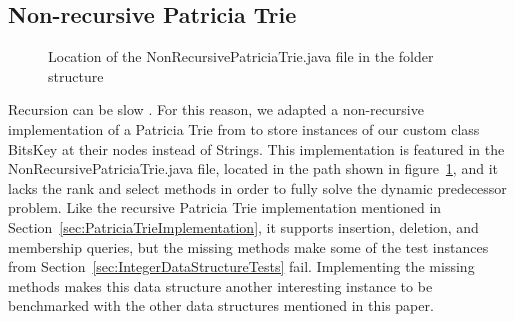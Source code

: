 \subsection{Non-recursive Patricia Trie}

\begin{figure}[H]
\caption{Location of the {\ttfamily NonRecursivePatriciaTrie.java} file in the folder structure}
\label{fig:NonRecursivePatriciaTrieTree}
\end{figure}

Recursion can be slow \cite{shirazi2003java}. For this reason, we adapted a non-recursive implementation of a Patricia Trie from \cite{patriciaSET} to store instances of our custom class {\ttfamily BitsKey} at their nodes instead of {\ttfamily String}s. This implementation is featured in the {\ttfamily NonRecursivePatriciaTrie.java} file, located in the path shown in figure~\ref{fig:NonRecursivePatriciaTrieTree}, and it lacks the {\ttfamily rank} and {\ttfamily select} methods in order to fully solve the dynamic predecessor problem. Like the recursive Patricia Trie implementation mentioned in Section~\ref{sec:PatriciaTrieImplementation}, it supports insertion, deletion, and membership queries, but the missing methods make some of the test instances from Section~\ref{sec:IntegerDataStructureTests} fail. Implementing the missing methods makes this data structure another interesting instance to be benchmarked with the other data structures mentioned in this paper.